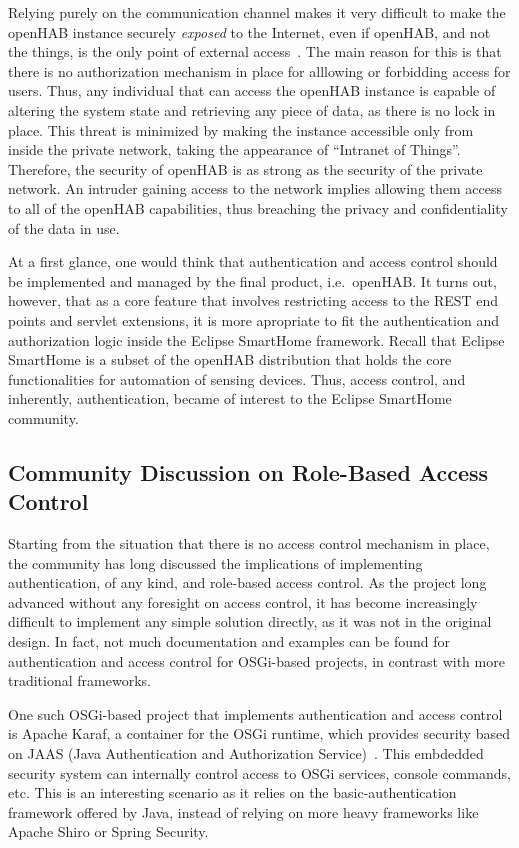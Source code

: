 \documentclass[12pt]{article}
\begin{document}
Relying purely on the communication channel makes it very difficult to make the openHAB instance securely \emph{exposed} to the Internet, even if openHAB, and not the things, is the only point of external access~\cite{openhab_03}. The main reason for this is that there is no authorization mechanism in place for alllowing or forbidding access for users. Thus, any individual that can access the openHAB instance is capable of altering the system state and retrieving any piece of data, as there is no lock in place. This threat is minimized by making the instance accessible only from inside the private network, taking the appearance of ``Intranet of Things''.  Therefore, the security of openHAB is as strong as the security of the private network. An intruder gaining access to the network implies allowing them access to all of the openHAB capabilities, thus breaching the privacy and confidentiality of the data in use.

At a first glance, one would think that authentication and access control should be implemented and managed by the final product, i.e.\ openHAB. It turns out, however, that as a core feature that involves restricting access to the REST end points and servlet extensions, it is more apropriate to fit the authentication and authorization logic inside the Eclipse SmartHome framework. Recall that Eclipse SmartHome is a subset of the openHAB distribution that holds the core functionalities for automation of sensing devices. Thus, access control, and inherently, authentication, became of interest to the Eclipse SmartHome community. 

\subsection{Community Discussion on Role-Based Access Control}
\label{ssec:discussion}

Starting from the situation that there is no access control mechanism in place, the community has long discussed the implications of implementing authentication, of any kind, and role-based access control. As the project long advanced without any foresight on access control, it has become increasingly difficult to implement any simple solution directly, as it was not in the original design. In fact, not much documentation and examples can be found for authentication and access control for OSGi-based projects, in contrast with more traditional frameworks.

One such OSGi-based project that implements authentication and access control is Apache Karaf, a container for the OSGi runtime, which provides security based on JAAS (Java Authentication and Authorization Service)~\cite{karaf}. This embdedded security system can internally control access to OSGi services, console commands, etc. This is an interesting scenario as it relies on the basic-authentication framework offered by Java, instead of relying on more heavy frameworks like Apache Shiro or Spring Security.
\end{document}
